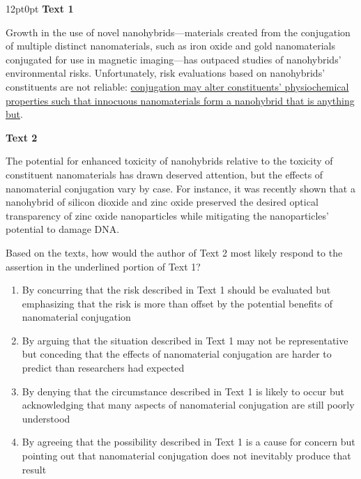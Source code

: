\documentclass[11pt, twocolumn]{article}
\newcounter{questionnum}
\begin{document}
\vspace{6pt}\noindent
\begin{minipage}{\columnwidth}\raggedright
\noindent{}\par\vspace{8pt}
\begin{adjustwidth}{12pt}{0pt}
\textbf{Text 1}

Growth in the use of novel nanohybrids---materials created from the conjugation of multiple distinct nanomaterials, such as iron oxide and gold nanomaterials conjugated for use in magnetic imaging---has outpaced studies of nanohybrids' environmental risks. Unfortunately, risk evaluations based on nanohybrids' constituents are not reliable: \uline{conjugation may alter constituents' physiochemical properties such that innocuous nanomaterials form a nanohybrid that is anything but}.

\vspace{8pt}
\textbf{Text 2}

The potential for enhanced toxicity of nanohybrids relative to the toxicity of constituent nanomaterials has drawn deserved attention, but the effects of nanomaterial conjugation vary by case. For instance, it was recently shown that a nanohybrid of silicon dioxide and zinc oxide preserved the desired optical transparency of zinc oxide nanoparticles while mitigating the nanoparticles' potential to damage DNA.
\vspace{6pt}

Based on the texts, how would the author of Text 2 most likely respond to the assertion in the underlined portion of Text 1?
\begin{enumerate}[label=\Alph*),leftmargin=18pt,topsep=3pt,itemsep=2pt]
  \item By concurring that the risk described in Text 1 should be evaluated but emphasizing that the risk is more than offset by the potential benefits of nanomaterial conjugation
  \item By arguing that the situation described in Text 1 may not be representative but conceding that the effects of nanomaterial conjugation are harder to predict than researchers had expected
  \item By denying that the circumstance described in Text 1 is likely to occur but acknowledging that many aspects of nanomaterial conjugation are still poorly understood
  \item By agreeing that the possibility described in Text 1 is a cause for concern but pointing out that nanomaterial conjugation does not inevitably produce that result
\end{enumerate}
\end{adjustwidth}
\end{minipage}\par
\end{document}
